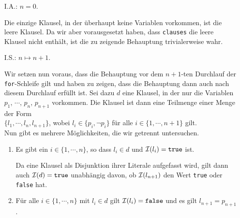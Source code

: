 \begin{enumerate}
\item[I.A.:] $n = 0$.

             Die einzige Klausel, in der \"{u}berhaupt keine Variablen vorkommen, ist die leere Klausel.
             Da wir aber vorausgesetzt haben, dass \texttt{clauses} die leere Klausel nicht enth\"{a}lt,
             ist die zu zeigende Behauptung trivialerweise wahr.
\item[I.S.:] $n \mapsto n+1$.

             Wir setzen nun voraus, dass die Behauptung vor dem $n\!+\!1$-ten Durchlauf der
             \texttt{for}-Schleife gilt und haben zu zeigen, dass die Behauptung dann auch nach
             diesem Durchlauf erf\"{u}llt ist.  Sei dazu $d$ eine Klausel, in der nur die Variablen
             $p_1$, $\cdots$, $p_n$, $p_{n+1}$ vorkommen.  Die Klausel ist dann eine Teilmenge einer
             Menge der Form
             \\[0.2cm]
             \hspace*{1.3cm}
             $\{ l_1, \cdots, l_n, l_{n+1} \}$, \quad wobei $l_i \in \{ p_i, \neg p_i \}$ f\"{u}r alle
             $i \in \{1,\cdots, n+1\}$ gilt.
             \\[0.2cm]
             Nun gibt es mehrere M\"{o}glichkeiten, die wir getrennt untersuchen.
             \begin{enumerate}
             \item Es gibt ein $i \in \{1,\cdots,n\}$, so dass $l_i \in d$ und  $\mathcal{I}(l_i) =
               \mathtt{true}$ ist.  

                   Da eine Klausel als Disjunktion ihrer Literale aufgefasst wird, gilt dann auch
                   $\mathcal{I}(d) = \mathtt{true}$ unabh\"{a}ngig davon, ob $\mathcal{I}(l_{n+1})$ den Wert \texttt{true} oder
                   \texttt{false} hat.
             \item F\"{u}r alle $i \in \{1,\cdots,n\}$ mit $l_i \in d$ gilt $\mathcal{I}(l_i) = \mathtt{false}$ und es gilt $l_{n+1} = p_{n+1}$.
                   

\end{enumerate}
\end{enumerate}
